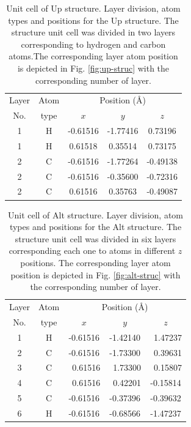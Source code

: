 \documentclass[floatfix,prb,aps,superscriptaddress,showpacs,11pt,preprint,letterpaper]{revtex4}
\begin{document}
\begin{table}[t]
\center
\begin{tabular}{ccccc}\\
\hline
\quad Layer \quad & \quad Atom \qquad & \multicolumn{3}{c}{Position (\AA)} \\
\cline{3-5}
\quad No.   \quad & \quad type \qquad & $x$ & $y$ & $z$  \\
\hline
1 & H & -0.61516 & -1.77416 &  0.73196 \\
1 & H &  0.61518 &  0.35514 &  0.73175 \\
2 & C & -0.61516 & -1.77264 & -0.49138 \\
2 & C & -0.61516 & -0.35600 & -0.72316 \\
2 & C &  0.61516 &  0.35763 & -0.49087 \\
\hline
\end{tabular}

\caption{Unit cell of Up structure. Layer division, atom types and
positions for the Up structure. The structure unit cell was divided in
two layers corresponding to hydrogen and carbon atoms.The corresponding layer
atom position is depicted in Fig. \ref{fig:up-struc} with the corresponding
number of layer.}
\label{tab:up-unitcell}
\end{table}
% 
% 
\begin{table}[t]
\center
\begin{tabular}{ccccc}\\
\hline
\quad Layer \quad & \quad Atom \qquad & \multicolumn{3}{c}{Position (\AA)} \\
\cline{3-5}
\quad No.   \quad & \quad type \qquad & $x$ & $y$ & $z$  \\
\hline
1 & H &  -0.61516 &  -1.42140 & \ 1.47237 \\
2 & C &  -0.61516 &  -1.73300 & \ 0.39631 \\
3 & C & \ 0.61516 & \ 1.73300 & \ 0.15807 \\
4 & C & \ 0.61516 & \ 0.42201 &  -0.15814 \\
5 & C &  -0.61516 &  -0.37396 &  -0.39632 \\
6 & H &  -0.61516 &  -0.68566 &  -1.47237 \\
\hline
\end{tabular}

\caption{Unit cell of Alt structure. Layer division, atom types and
positions for the Alt structure. The structure unit cell was divided in
six layers corresponding each one to atoms in different $z$ positions. The
corresponding layer atom position is depicted in Fig. \ref{fig:alt-struc} with
the corresponding number of layer.}
\label{tab:alt-unitcell}
\end{table}
\end{document}
